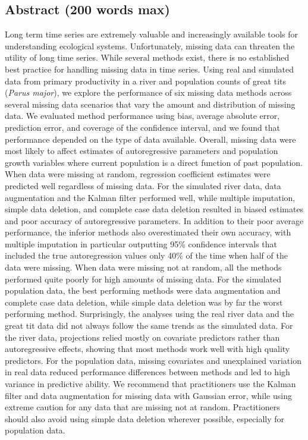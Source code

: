 \documentclass{article}
\begin{document}
\begin{linenumbers}
\section*{Abstract (200 words max)} %
Long term time series are extremely valuable and increasingly available tools for understanding ecological systems. Unfortunately, missing data can threaten the utility of long time series. While several methods exist, there is no established best practice for handling missing data in time series. Using real and simulated data from primary productivity in a river and population counts of great tits (\textit{Parus major}), we explore the performance of six missing data methods across several missing data scenarios that vary the amount and distribution of missing data. We evaluated method performance using bias, average absolute error, prediction error, and coverage of the confidence interval, and we found that performance depended on the type of data available. Overall, missing data were most likely to affect estimates of autoregressive parameters and population growth variables where current population is a direct function of past population. When data were missing at random, regression coefficient estimates were predicted well regardless of missing data. For the simulated river data, data augmentation and the Kalman filter performed well, while multiple imputation, simple data deletion, and complete case data deletion resulted in biased estimates and poor accuracy of autoregressive parameters. In addition to their poor average performance, the inferior methods also overestimated their own accuracy, with multiple imputation in particular outputting 95\% confidence intervals that included the true autoregression values only 40\% of the time when half of the data were missing. When data were missing not at random, all the methods performed quite poorly for high amounts of missing data. For the simulated population data, the best performing methods were data augmentation and complete case data deletion, while simple data deletion was by far the worst performing method. Surprisingly, the analyses using the real river data and the great tit data did not always follow the same trends as the simulated data. For the river data, projections relied mostly on covariate predictors rather than autoregressive effects, showing that most methods work well with high quality predictors. For the population data, missing covariates and unexplained variation in real data reduced performance differences between methods and led to high variance in predictive ability. We recommend that practitioners use the Kalman filter and data augmentation for missing data with Gaussian error, while using extreme caution for any data that are missing not at random. Practitioners should also avoid using simple data deletion wherever possible, especially for population data.


\end{linenumbers}
\end{document}
